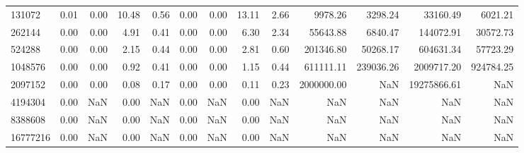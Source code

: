 \begin{tabular}{lrrrrrrrrrrrr}
131072 & 0.01 & 0.00 & 10.48 & 0.56 & 0.00 & 0.00 & 13.11 & 2.66 & 9978.26 & 3298.24 & 33160.49 & 6021.21 \\
262144 & 0.00 & 0.00 & 4.91 & 0.41 & 0.00 & 0.00 & 6.30 & 2.34 & 55643.88 & 6840.47 & 144072.91 & 30572.73 \\
524288 & 0.00 & 0.00 & 2.15 & 0.44 & 0.00 & 0.00 & 2.81 & 0.60 & 201346.80 & 50268.17 & 604631.34 & 57723.29 \\
1048576 & 0.00 & 0.00 & 0.92 & 0.41 & 0.00 & 0.00 & 1.15 & 0.44 & 611111.11 & 239036.26 & 2009717.20 & 924784.25 \\
2097152 & 0.00 & 0.00 & 0.08 & 0.17 & 0.00 & 0.00 & 0.11 & 0.23 & 2000000.00 & NaN & 19275866.61 & NaN \\
4194304 & 0.00 & NaN & 0.00 & NaN & 0.00 & NaN & 0.00 & NaN & NaN & NaN & NaN & NaN \\
8388608 & 0.00 & NaN & 0.00 & NaN & 0.00 & NaN & 0.00 & NaN & NaN & NaN & NaN & NaN \\
16777216 & 0.00 & NaN & 0.00 & NaN & 0.00 & NaN & 0.00 & NaN & NaN & NaN & NaN & NaN \\
\bottomrule
\end{tabular}
